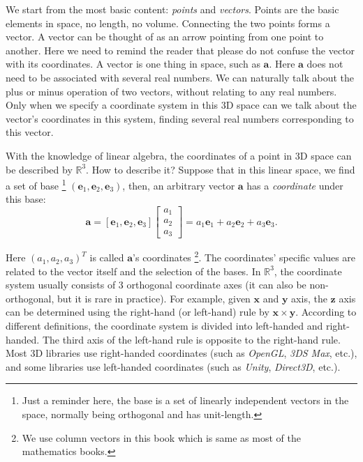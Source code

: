 We start from the most basic content: \textit{points} and \textit{vectors}. Points are the basic elements in space, no length, no volume. Connecting the two points forms a vector. A vector can be thought of as an arrow pointing from one point to another. Here we need to remind the reader that please do not confuse the vector with its coordinates. A vector is one thing in space, such as $ \mathbf{a}$. Here $ \mathbf{a} $ does not need to be associated with several real numbers. We can naturally talk about the plus or minus operation of two vectors, without relating to any real numbers. Only when we specify a coordinate system in this 3D space can we talk about the vector's coordinates in this system, finding several real numbers corresponding to this vector.

With the knowledge of linear algebra, the coordinates of a point in 3D space can be described by $ \mathbb{R}^3$. How to describe it? Suppose that in this linear space, we find a set of base \footnote{Just a reminder here, the base is a set of linearly independent vectors in the space, normally being orthogonal and has unit-length.} $ (\mathbf{e}_1,\mathbf{e}_2,\mathbf{e}_3) $, then, an arbitrary vector $ \mathbf{a} $ has a \textit{coordinate} under this base:
\begin{equation}
\mathbf{a} = \left[ {{\mathbf{e}_1},{\mathbf{e}_2},{\mathbf{e}_3}} \right]\left[ \begin{array}{l}
{a_1}\\
{a_2}\\
{a_3}
\end{array} \right] = {a_1}{\mathbf{e}_1} + {a_2}{\mathbf{e}_2} + {a_3}{\mathbf{e}_3}.
\end{equation}

Here $ (a_ 1, a_ 2, a_ 3 )^{T} $ is called $\mathbf {a}$'s coordinates \footnote {We use column vectors in this book which is same as most of the  mathematics books.}. The coordinates' specific values are related to the vector itself and the selection of the bases. In $\mathbb{R}^3$, the coordinate system usually consists of 3 orthogonal coordinate axes (it can also be non-orthogonal, but it is rare in practice). For example, given $ \mathbf {x} $ and $ \mathbf {y} $ axis, the $ \mathbf {z} $ axis can be determined using the right-hand (or left-hand) rule by $ \mathbf {x} \times  \mathbf {y} $. According to different definitions, the coordinate system is divided into left-handed and right-handed. The third axis of the left-hand rule is opposite to the right-hand rule. Most 3D libraries use right-handed coordinates (such as \textit{OpenGL}, \textit{3DS Max}, etc.), and some libraries use left-handed coordinates (such as \textit{Unity}, \textit{Direct3D}, etc.).

